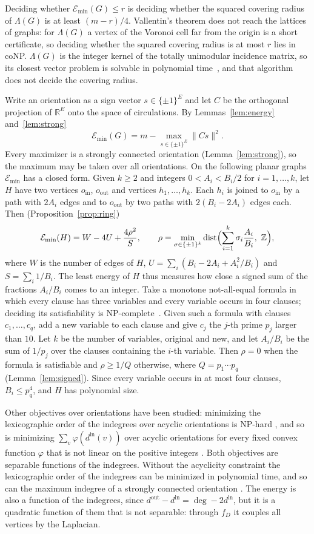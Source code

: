\documentclass[11pt]{amsart}
\theoremstyle{definition}
\theoremstyle{remark}
\numberwithin{equation}{section}
\DeclareMathOperator{\dist}{dist}
\newcommand{\Emin}{\mathcal E_{\min}}
\newcommand{\Z}{\mathbb Z}
\newcommand{\R}{\mathbb R}
\begin{document}
Deciding whether $\Emin(G)\le r$ is deciding whether the squared covering radius of $\Lambda(G)$ is at least $(m-r)/4$. Vallentin's theorem does not reach the lattices of graphs: for $\Lambda(G)$ a vertex of the Voronoi cell far from the origin is a short certificate, so deciding whether the squared covering radius is at most $r$ lies in coNP. $\Lambda(G)$ is the integer kernel of the totally unimodular incidence matrix, so its closest vector problem is solvable in polynomial time~\cite{MPSV21}, and that algorithm does not decide the covering radius.

Write an orientation as a sign vector $s\in\{\pm1\}^E$ and let $C$ be the orthogonal projection of $\R^E$ onto the space of circulations. By Lemmas~\ref{lem:energy} and~\ref{lem:strong}
\[
\Emin(G)=m-\max_{s\in\{\pm1\}^E}\|Cs\|^2 .
\]
Every maximizer is a strongly connected orientation (Lemma~\ref{lem:strong}), so the maximum may be taken over all orientations. On the following planar graphs $\Emin$ has a closed form. Given $k\ge2$ and integers $0<A_i<B_i/2$ for $i=1,\dots,k$, let $H$ have two vertices $o_{\mathrm{in}}$, $o_{\mathrm{out}}$ and vertices $h_1,\dots,h_k$. Each $h_i$ is joined to $o_{\mathrm{in}}$ by a path with $2A_i$ edges and to $o_{\mathrm{out}}$ by two paths with $2(B_i-2A_i)$ edges each. Then (Proposition~\ref{prop:ring})
\[
\Emin(H)=W-4U+\frac{4\rho^2}{S},\qquad \rho=\min_{\sigma\in\{\pm1\}^k}\dist\Bigl(\sum_{i=1}^k\sigma_i\frac{A_i}{B_i},\ \Z\Bigr),
\]
where $W$ is the number of edges of $H$, $U=\sum_i(B_i-2A_i+A_i^2/B_i)$ and $S=\sum_i1/B_i$. The least energy of $H$ thus measures how close a signed sum of the fractions $A_i/B_i$ comes to an integer. Take a monotone not-all-equal formula in which every clause has three variables and every variable occurs in four clauses; deciding its satisfiability is NP-complete~\cite[Theorem~1]{DD20}. Given such a formula with clauses $c_1,\dots,c_q$, add a new variable to each clause and give $c_j$ the $j$-th prime $p_j$ larger than $10$. Let $k$ be the number of variables, original and new, and let $A_i/B_i$ be the sum of $1/p_j$ over the clauses containing the $i$-th variable. Then $\rho=0$ when the formula is satisfiable and $\rho\ge1/Q$ otherwise, where $Q=p_1\cdots p_q$ (Lemma~\ref{lem:signed}). Since every variable occurs in at most four clauses, $B_i\le p_q^4$, and $H$ has polynomial size.

Other objectives over orientations have been studied: minimizing the lexicographic order of the indegrees over acyclic orientations is NP-hard \cite{BIMOWZ17}, and so is minimizing $\sum_v\varphi(d^{\mathrm{in}}(v))$ over acyclic orientations for every fixed convex function $\varphi$ that is not linear on the positive integers \cite{BM25}. Both objectives are separable functions of the indegrees. Without the acyclicity constraint the lexicographic order of the indegrees can be minimized in polynomial time, and so can the maximum indegree of a strongly connected orientation \cite{BIMOWZ17}. The energy is also a function of the indegrees, since $d^{\mathrm{out}}-d^{\mathrm{in}}=\deg-2d^{\mathrm{in}}$, but it is a quadratic function of them that is not separable: through $f_D$ it couples all vertices by the Laplacian.
\end{document}

